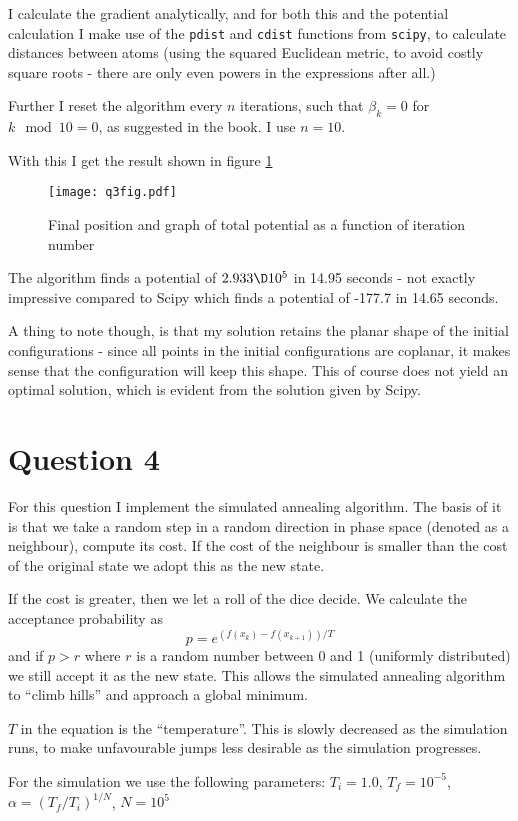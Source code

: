 \documentclass[a4paper,10pt]{article}
\begin{document}
	I calculate the gradient analytically, and for both this and the potential calculation I make use of the \texttt{pdist} and \texttt{cdist} functions from \texttt{scipy}, to calculate distances between atoms (using the squared Euclidean metric, to avoid costly square roots - there are only even powers in the expressions after all.)
	
	Further I reset the algorithm every $ n $ iterations, such that $ \beta_k = 0 $ for $ k \mod 10  = 0  $, as suggested in the book. I use $ n=10 $.
	
	With this I get the result shown in figure \ref{fig:q3fig}
	
	\begin{figure}[H]
		\centering
		\texttt{[image: q3fig.pdf]}
		\caption{Final position and graph of total potential as a function of iteration number}
		\label{fig:q3fig}
	\end{figure}

	The algorithm finds a potential of $ 2.933\D10^{5} $ in 14.95 seconds - not exactly impressive compared to Scipy which finds a potential of -177.7 in 14.65 seconds.
	
	A thing to note though, is that my solution retains the planar shape of the initial configurations - since all points in the initial configurations are coplanar, it makes sense that the configuration will keep this shape. This of course does not yield an optimal solution, which is evident from the solution given by Scipy.
	
	\section*{Question 4}
	For this question I implement the simulated annealing algorithm. The basis of it is that we take a random step in a random direction in phase space (denoted as a neighbour), compute its cost. If the cost of the neighbour is smaller than the cost of the original state we adopt this as the new state.
	
	If the cost is greater, then we let a roll of the dice decide. We calculate the acceptance probability as
	\begin{equation}\label{key}
		p = e^{(f(x_k) - f(x_{k+1}))/T}
	\end{equation}
	and if $ p>r $ where $ r $ is a random number between 0 and 1 (uniformly distributed) we still accept it as the new state. This allows the simulated annealing algorithm to ``climb hills'' and approach a global minimum.
	
	$ T $ in the equation is the ``temperature''. This is slowly decreased as the simulation runs, to make unfavourable jumps less desirable as the simulation progresses.
	
	For the simulation we use the following parameters: $ T_i = 1.0 $, $ T_f = 10^{-5} $, $\alpha = (T_f/T_i)^{1/N} $, $ N=10^5 $
	
	
\end{document}
